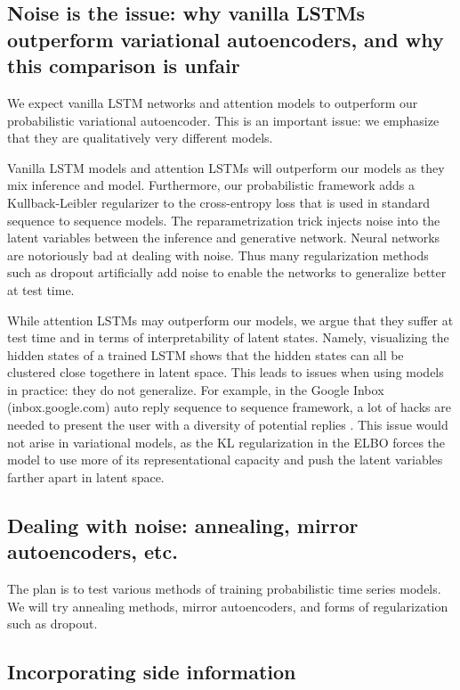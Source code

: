 \subsection*{Noise is the issue: why vanilla LSTMs outperform variational autoencoders, and why this comparison is unfair}

We expect vanilla LSTM networks and attention models to outperform our probabilistic variational autoencoder. This is an important issue:  we emphasize that they are qualitatively very different models.

Vanilla LSTM models and attention LSTMs will outperform our models as they mix inference and model. Furthermore, our probabilistic framework adds a Kullback-Leibler regularizer to the cross-entropy loss that is used in standard sequence to sequence models. The reparametrization trick \citep{Kingma2014} injects noise into the latent variables between the inference and generative network. Neural networks are notoriously bad at dealing with noise. Thus many regularization methods such as dropout \citep{Hinton2014} artificially add noise to enable the networks to generalize better at test time.

While attention LSTMs may outperform our models, we argue that they suffer at test time and in terms of interpretability of latent states. Namely, visualizing the hidden states of a trained LSTM shows that the hidden states can all be clustered close togethere in latent space. This leads to issues when using models in practice: they do not generalize. For example, in the Google Inbox (inbox.google.com) auto reply sequence to sequence framework, a lot of hacks are needed to present the user with a diversity of potential replies \citep{Corrado}. This issue would not arise in variational models, as the KL regularization in the ELBO forces the model to use more of its representational capacity and push the latent variables farther apart in latent space.

\subsection*{Dealing with noise: annealing, mirror autoencoders, etc.}

The plan is to test various methods of training probabilistic time series models. We will try annealing methods, mirror autoencoders, and forms of regularization such as dropout.

\subsection*{Incorporating side information}

